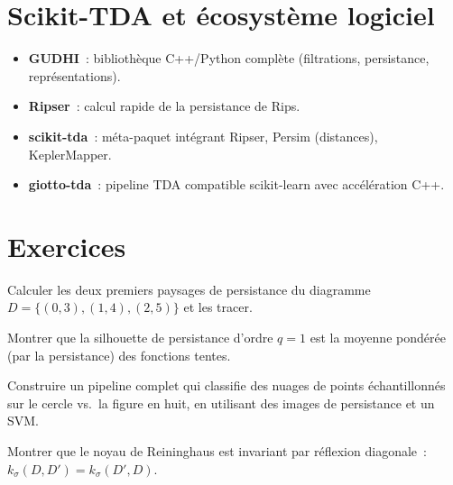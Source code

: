 \section{Scikit-TDA et \'ecosyst\`eme logiciel}
\label{sec:scikit_tda}

\begin{remarque}
\begin{itemize}
  \item \textbf{GUDHI}~: biblioth\`eque C++/Python compl\`ete
        (filtrations, persistance, repr\'esentations).
  \item \textbf{Ripser}~: calcul rapide de la persistance de Rips.
  \item \textbf{scikit-tda}~: m\'eta-paquet int\'egrant Ripser,
        Persim (distances), KeplerMapper.
  \item \textbf{giotto-tda}~: pipeline TDA compatible scikit-learn
        avec acc\'el\'eration C++.
\end{itemize}
\end{remarque}

\section{Exercices}

\begin{exercice}
Calculer les deux premiers paysages de persistance du diagramme
$D = \{(0, 3), (1, 4), (2, 5)\}$ et les tracer.
\end{exercice}

\begin{exercice}
Montrer que la silhouette de persistance d'ordre $q = 1$ est la
moyenne pond\'er\'ee (par la persistance) des fonctions tentes.
\end{exercice}

\begin{exercice}
Construire un pipeline complet qui classifie des nuages de points
\'echantillonn\'es sur le cercle vs.\ la figure en huit, en utilisant
des images de persistance et un SVM.
\end{exercice}

\begin{exercice}
Montrer que le noyau de Reininghaus est invariant par r\'eflexion
diagonale~: $k_\sigma(D, D') = k_\sigma(D', D)$.
\end{exercice}


